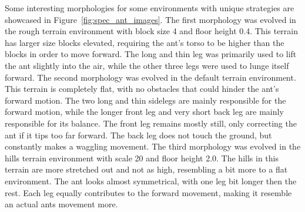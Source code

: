         Some interesting morphologies for some environments with unique strategies are showcased in Figure~\ref{fig:spec_ant_images}. The first morphology was evolved in the rough terrain environment with block size 4 and floor height 0.4. This terrain has larger size blocks elevated, requiring the ant's torso to be higher than the blocks in order to move forward. The long and thin leg was primarily used to lift the ant slightly into the air, while the other three legs were used to lunge itself forward. The second morphology was evolved in the default terrain environment. This terrain is completely flat, with no obstacles that could hinder the ant's forward motion. The two long and thin sidelegs are mainly responsible for the forward motion, while the longer front leg and very short back leg are mainly responsible for its balance. The front leg remains mostly still, only correcting the ant if it tips too far forward. The back leg does not touch the ground, but constantly makes a waggling movement. The third morphology was evolved in the hills terrain environment with scale 20 and floor height 2.0. The hills in this terrain are more stretched out and not as high, resembling a bit more to a flat environment. The ant looks almost symmetrical, with one leg bit longer then the rest. Each leg equally contributes to the forward movement, making it resemble an actual ants movement more. 



